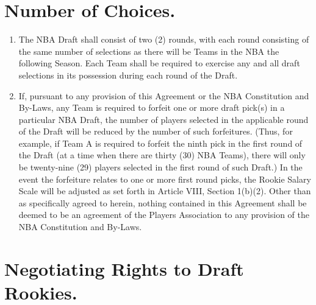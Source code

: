 \documentclass[
]{book}
\providecommand{\tightlist}{%
  \setlength{\itemsep}{0pt}\setlength{\parskip}{0pt}}
\begin{document}
\hypertarget{number-of-choices.}{%
\section{Number of Choices.}\label{number-of-choices.}}

\begin{enumerate}
\def\labelenumi{(\alph{enumi})}
\tightlist
\item
  The NBA Draft shall consist of two (2) rounds, with each round consisting of the same number of selections as there will be Teams in the NBA the following Season. Each Team shall be required to exercise any and all draft selections in its possession during each round of the Draft.
\item
  If, pursuant to any provision of this Agreement or the NBA Constitution and By-Laws, any Team is required to forfeit one or more draft pick(s) in a particular NBA Draft, the number of players selected in the applicable round of the Draft will be reduced by the number of such forfeitures. (Thus, for example, if Team A is required to forfeit the ninth pick in the first round of the Draft (at a time when there are thirty (30) NBA Teams), there will only be twenty-nine (29) players selected in the first round of such Draft.) In the event the forfeiture relates to one or more first round picks, the Rookie Salary Scale will be adjusted as set forth in Article VIII, Section 1(b)(2). Other than as specifically agreed to herein, nothing contained in this Agreement shall be deemed to be an agreement of the Players Association to any provision of the NBA Constitution and By-Laws.
\end{enumerate}

\hypertarget{negotiating-rights-to-draft-rookies.}{%
\section{Negotiating Rights to Draft Rookies.}\label{negotiating-rights-to-draft-rookies.}}
\end{document}
